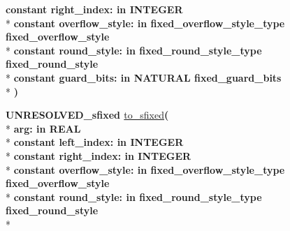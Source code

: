 \begin{DoxyCompactItemize}
{\bfseries {\bfseries \textcolor{keywordflow}{constant}\textcolor{vhdlchar}{ }}\textcolor{vhdlchar}{right\+\_\+index\+: }\textcolor{stringliteral}{in }{\bfseries \textcolor{comment}{I\+N\+T\+E\+G\+E\+R}\textcolor{vhdlchar}{ }}}\\*
{\bfseries {\bfseries \textcolor{keywordflow}{constant}\textcolor{vhdlchar}{ }}\textcolor{vhdlchar}{overflow\+\_\+style\+: }\textcolor{stringliteral}{in }\textcolor{vhdlchar}{fixed\+\_\+overflow\+\_\+style\+\_\+type     fixed\+\_\+overflow\+\_\+style}}\\*
{\bfseries {\bfseries \textcolor{keywordflow}{constant}\textcolor{vhdlchar}{ }}\textcolor{vhdlchar}{round\+\_\+style\+: }\textcolor{stringliteral}{in }\textcolor{vhdlchar}{fixed\+\_\+round\+\_\+style\+\_\+type     fixed\+\_\+round\+\_\+style}}\\*
{\bfseries {\bfseries \textcolor{keywordflow}{constant}\textcolor{vhdlchar}{ }}\textcolor{vhdlchar}{guard\+\_\+bits\+: }\textcolor{stringliteral}{in }\textcolor{vhdlchar}{N\+A\+T\+U\+R\+A\+L     fixed\+\_\+guard\+\_\+bits}}\\*
{\bfseries  )} 
\item 
{\bfseries {\bfseries \textcolor{vhdlchar}{U\+N\+R\+E\+S\+O\+L\+V\+E\+D\+\_\+sfixed}\textcolor{vhdlchar}{ }}} \hyperlink{class__fixed__pkg_ac9269a406e86f4b7816e2e357d628649}{to\+\_\+sfixed}{\bfseries  ( }\\*
{\bfseries \textcolor{vhdlchar}{arg\+: }\textcolor{stringliteral}{in }{\bfseries \textcolor{comment}{R\+E\+A\+L}\textcolor{vhdlchar}{ }}}\\*
{\bfseries {\bfseries \textcolor{keywordflow}{constant}\textcolor{vhdlchar}{ }}\textcolor{vhdlchar}{left\+\_\+index\+: }\textcolor{stringliteral}{in }{\bfseries \textcolor{comment}{I\+N\+T\+E\+G\+E\+R}\textcolor{vhdlchar}{ }}}\\*
{\bfseries {\bfseries \textcolor{keywordflow}{constant}\textcolor{vhdlchar}{ }}\textcolor{vhdlchar}{right\+\_\+index\+: }\textcolor{stringliteral}{in }{\bfseries \textcolor{comment}{I\+N\+T\+E\+G\+E\+R}\textcolor{vhdlchar}{ }}}\\*
{\bfseries {\bfseries \textcolor{keywordflow}{constant}\textcolor{vhdlchar}{ }}\textcolor{vhdlchar}{overflow\+\_\+style\+: }\textcolor{stringliteral}{in }\textcolor{vhdlchar}{fixed\+\_\+overflow\+\_\+style\+\_\+type     fixed\+\_\+overflow\+\_\+style}}\\*
{\bfseries {\bfseries \textcolor{keywordflow}{constant}\textcolor{vhdlchar}{ }}\textcolor{vhdlchar}{round\+\_\+style\+: }\textcolor{stringliteral}{in }\textcolor{vhdlchar}{fixed\+\_\+round\+\_\+style\+\_\+type     fixed\+\_\+round\+\_\+style}}\\*

\end{DoxyCompactItemize}
